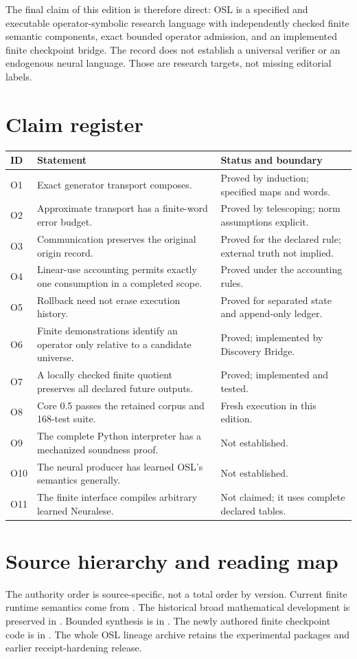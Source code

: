 \documentclass[11pt]{article}
\begin{document}
The final claim of this edition is therefore direct: OSL is a specified and executable operator-symbolic research language with independently checked finite semantic components, exact bounded operator admission, and an implemented finite checkpoint bridge. The record does not establish a universal verifier or an endogenous neural language. Those are research targets, not missing editorial labels.

\clearpage
\appendix
\section{Claim register}
\begin{longtable}{P{0.12\textwidth}P{0.43\textwidth}P{0.35\textwidth}}
\toprule ID & Statement & Status and boundary\\\midrule\endhead
O1 & Exact generator transport composes. & Proved by induction; specified maps and words.\\
O2 & Approximate transport has a finite-word error budget. & Proved by telescoping; norm assumptions explicit.\\
O3 & Communication preserves the original origin record. & Proved for the declared rule; external truth not implied.\\
O4 & Linear-use accounting permits exactly one consumption in a completed scope. & Proved under the accounting rules.\\
O5 & Rollback need not erase execution history. & Proved for separated state and append-only ledger.\\
O6 & Finite demonstrations identify an operator only relative to a candidate universe. & Proved; implemented by Discovery Bridge.\\
O7 & A locally checked finite quotient preserves all declared future outputs. & Proved; implemented and tested.\\
O8 & Core 0.5 passes the retained corpus and 168-test suite. & Fresh execution in this edition.\\
O9 & The complete Python interpreter has a mechanized soundness proof. & Not established.\\
O10 & The neural producer has learned OSL's semantics generally. & Not established.\\
O11 & The finite interface compiles arbitrary learned Neuralese. & Not claimed; it uses complete declared tables.\\\bottomrule
\end{longtable}

\section{Source hierarchy and reading map}
The authority order is source-specific, not a total order by version. Current finite runtime semantics come from . The historical broad mathematical development is preserved in . Bounded synthesis is in . The newly authored finite checkpoint code is in . The whole OSL lineage archive retains the experimental packages and earlier receipt-hardening release.
\end{document}
